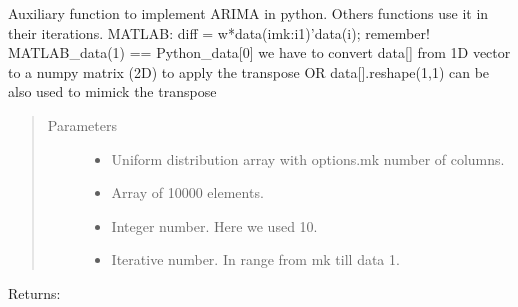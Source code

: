 \documentclass[letterpaper,10pt,english]{sphinxmanual}
\begin{document}
\begin{fulllineitems}
\label{\detokenize{LDS:LDS.OnlineLDS_library.diff_calc}}
\sphinxAtStartPar
Auxiliary function to implement ARIMA in python. Others functions use it in their
iterations.
MATLAB: diff = w*data(i\sphinxhyphen{}mk:i\sphinxhyphen{}1)’\sphinxhyphen{}data(i);
remember! MATLAB\_data(1) == Python\_data{[}0{]}
we have to convert data{[}{]} from 1D vector to a numpy matrix (2D) to apply the transpose
OR data{[}{]}.reshape(\sphinxhyphen{}1,1) can be also used to mimick the transpose
\begin{quote}\begin{description}
\item[{Parameters}] \leavevmode\begin{itemize}
\item {} 
\sphinxAtStartPar
{} \textendash{} Uniform distribution array with options.mk number of columns.

\item {} 
\sphinxAtStartPar
{} \textendash{} Array of 10000 elements.

\item {} 
\sphinxAtStartPar
{} \textendash{} Integer number. Here we used 10.

\item {} 
\sphinxAtStartPar
{} \textendash{} Iterative number. In range from mk till data \sphinxhyphen{} 1.

\end{itemize}

\end{description}\end{quote}

\sphinxAtStartPar
Returns:

\end{fulllineitems}

\end{document}
